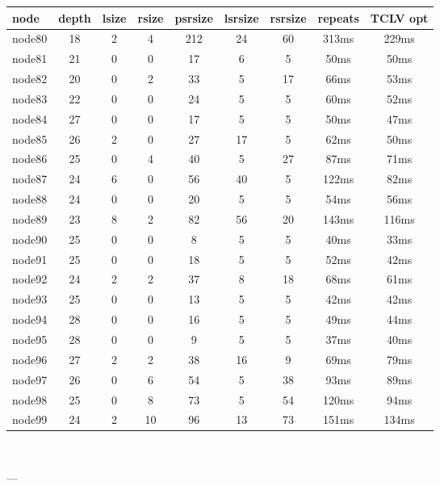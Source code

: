 \begin{tabular}{|l|c|c|c|c|c|c|c|c|}
\hline node & depth & lsize & rsize & psrsize & lsrsize & rsrsize   & repeats & TCLV opt\\
    \hline node80 & 18 & 2 & 4 & 212 & 24 & 60 & 313ms & 229ms\\
    \hline node81 & 21 & 0 & 0 & 17 & 6 & 5 & 50ms & 50ms\\
    \hline node82 & 20 & 0 & 2 & 33 & 5 & 17 & 66ms & 53ms\\
    \hline node83 & 22 & 0 & 0 & 24 & 5 & 5 & 60ms & 52ms\\
    \hline node84 & 27 & 0 & 0 & 17 & 5 & 5 & 50ms & 47ms\\
    \hline node85 & 26 & 2 & 0 & 27 & 17 & 5 & 62ms & 50ms\\
    \hline node86 & 25 & 0 & 4 & 40 & 5 & 27 & 87ms & 71ms\\
    \hline node87 & 24 & 6 & 0 & 56 & 40 & 5 & 122ms & 82ms\\
    \hline node88 & 24 & 0 & 0 & 20 & 5 & 5 & 54ms & 56ms\\
    \hline node89 & 23 & 8 & 2 & 82 & 56 & 20 & 143ms & 116ms\\
    \hline node90 & 25 & 0 & 0 & 8 & 5 & 5 & 40ms & 33ms\\
    \hline node91 & 25 & 0 & 0 & 18 & 5 & 5 & 52ms & 42ms\\
    \hline node92 & 24 & 2 & 2 & 37 & 8 & 18 & 68ms & 61ms\\
    \hline node93 & 25 & 0 & 0 & 13 & 5 & 5 & 42ms & 42ms\\
    \hline node94 & 28 & 0 & 0 & 16 & 5 & 5 & 49ms & 44ms\\
    \hline node95 & 28 & 0 & 0 & 9 & 5 & 5 & 37ms & 40ms\\
    \hline node96 & 27 & 2 & 2 & 38 & 16 & 9 & 69ms & 79ms\\
    \hline node97 & 26 & 0 & 6 & 54 & 5 & 38 & 93ms & 89ms\\
    \hline node98 & 25 & 0 & 8 & 73 & 5 & 54 & 120ms & 94ms\\
    \hline node99 & 24 & 2 & 10 & 96 & 13 & 73 & 151ms & 134ms\\

\hline
\end{tabular} \

---


